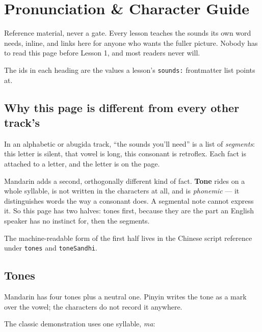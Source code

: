
\chapter*{Pronunciation \& Character Guide}

Reference material, never a gate. Every lesson teaches the sounds its own word needs, inline, and links here for anyone who wants the fuller picture. Nobody has to read this page before Lesson 1, and most readers never will.

The ids in each heading are the values a lesson's \texttt{sounds:} frontmatter list points at.

\section*{Why this page is different from every other track's}

In an alphabetic or abugida track, \textquotedblleft{}the sounds you'll need\textquotedblright{} is a list of \emph{segments}: this letter is silent, that vowel is long, this consonant is retroflex. Each fact is attached to a letter, and the letter is on the page.

Mandarin adds a second, orthogonally different kind of fact. \textbf{Tone} rides on a whole syllable, is not written in the characters at all, and is \emph{phonemic} — it distinguishes words the way a consonant does. A segmental note cannot express it. So this page has two halves: tones first, because they are the part an English speaker has no instinct for, then the segments.

The machine-readable form of the first half lives in the Chinese script reference under \texttt{tones} and \texttt{toneSandhi}.

\section*{Tones}

Mandarin has four tones plus a neutral one. Pinyin writes the tone as a mark over the vowel; the characters do not record it anywhere.

The classic demonstration uses one syllable, \emph{ma}:

